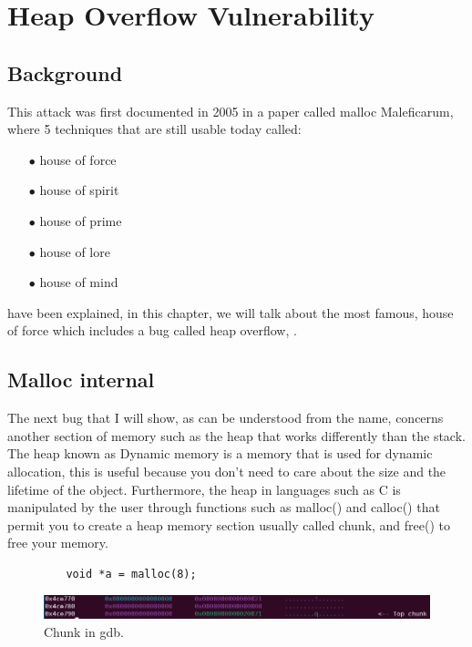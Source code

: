 \chapter{Heap Overflow Vulnerability}
    \section{Background}
        This attack was first documented in 2005 in a paper called malloc Maleficarum, where 5 techniques that are still usable today called: 
       \begin{itemize}
        \item[$\bullet$] house of force
        \item[$\bullet$] house of spirit
        \item[$\bullet$] house of prime  
        \item[$\bullet$] house of lore 
        \item[$\bullet$] house of mind
    \end{itemize}

    have been explained, in this chapter, we will talk about the most famous, house of force which includes a bug called heap overflow, \cite{Heaplab}.
    \clearpage
    
    \section{Malloc internal}
    The next bug that I will show, as can be understood from the name, concerns another section of memory such as the heap that works differently than the stack.\newline
    The heap known as Dynamic memory is a memory that is used for dynamic allocation, this is useful because you don't need to care about the size and the lifetime of the object. \newline
    Furthermore, the heap in languages such as C is manipulated by the user through functions such as malloc() and calloc() that permit you to create a heap memory section usually called chunk, and free() to free your memory.\newline
     \begin{verbatim}
         void *a = malloc(8);
     \end{verbatim}

    \begin{figure}[htbp]
        \centering
        \includegraphics[width=1.1\linewidth]{Images/chunk_structure.png}
        \caption{Chunk in gdb.}
        \label{fig:enter-label}
    \end{figure}
    
